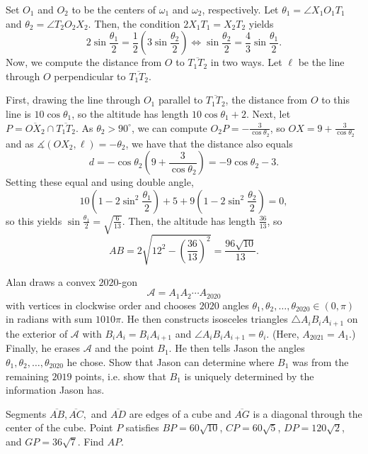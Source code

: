 \begin{solution}[name={Solution by HamstPan38825}]
	Set $O_1$ and $O_2$ to be the centers of $\omega_1$ and $\omega_2$, respectively. Let $\theta_1 = \angle X_1O_1T_1$ and $\theta_2 = \angle T_2O_2X_2$. Then, the condition $2X_1T_1 = X_2T_2$ yields$$2\sin \frac{\theta_1}2 = \frac 12\left(3 \sin \frac{\theta_2}2\right) \iff \sin \frac{\theta_2}2 = \frac 43 \sin \frac{\theta_1}2.$$Now, we compute the distance from $O$ to $\overline{T_1T_2}$ in two ways. Let $\ell$ be the line through $O$ perpendicular to $\overline{T_1T_2}$.
	
	First, drawing the line through $O_1$ parallel to $\overline{T_1T_2}$, the distance from $O$ to this line is $10 \cos \theta_1$, so the altitude has length $10\cos\theta_1 + 2$. Next, let $P = \overline{OX_2} \cap \overline{T_1T_2}$. As $\theta_2 > 90^\circ$, we can compute $O_2P = -\frac 3{\cos \theta_2}$, so $OX = 9+\frac 3{\cos \theta_2}$ and as $\measuredangle(OX_2, \ell) = -\theta_2$, we have that the distance also equals$$d = -\cos \theta_2\left(9+\frac 3{\cos \theta_2}\right) = -9\cos\theta_2 - 3.$$Setting these equal and using double angle,$$10\left(1-2\sin^2 \frac{\theta_1}2\right) + 5 + 9\left(1-2\sin^2 \frac{\theta_2}2\right) = 0,$$so this yields $\sin \frac{\theta_1}2 = \sqrt{\frac 6{13}}$. Then, the altitude has length $\frac{36}{13}$, so$$AB = 2\sqrt{12^2 - \left(\frac{36}{13}\right)^2} = \boxed{\frac{96\sqrt{10}}{13}}.$$
\end{solution}



\begin{question}[name={2020 HMMT, Team, \href{https://artofproblemsolving.com/community/c129h2008281p14065369}{Problem 4}}]
	Alan draws a convex $2020$-gon $$\mathcal{A}=A_1A_2\dotsm A_{2020}$$ with vertices in clockwise order and chooses $2020$ angles $\theta_1, \theta_2, \dotsc, \theta_{2020}\in (0, \pi)$ in radians with sum $1010\pi$. He then constructs isosceles triangles $\triangle A_iB_iA_{i+1}$ on the exterior of $\mathcal{A}$ with $B_iA_i=B_iA_{i+1}$ and $\angle A_iB_iA_{i+1}=\theta_i$. (Here, $A_{2021}=A_1$.) Finally, he erases $\mathcal{A}$ and the point $B_1$. He then tells Jason the angles $\theta_1, \theta_2, \dotsc, \theta_{2020}$ he chose. Show that Jason can determine where $B_1$ was from the remaining $2019$ points, i.e. show that $B_1$ is uniquely determined by the information Jason has.
\end{question}




\begin{question}[name={2021 AIME I, \href{https://artofproblemsolving.com/community/c4p20872458}{Problem 6}}]
	Segments $\overline{AB}, \overline{AC},$ and $\overline{AD}$ are edges of a cube and $\overline{AG}$ is a diagonal through the center of the cube. Point $P$ satisfies $BP=60\sqrt{10}$, $CP=60\sqrt{5}$, $DP=120\sqrt{2}$, and $GP=36\sqrt{7}$. Find $AP.$	
\end{question}













